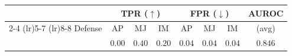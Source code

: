\begin{tabular}{l ccc ccc c}
  \toprule
  & \multicolumn{3}{c}{TPR ($\uparrow$)} & \multicolumn{3}{c}{FPR ($\downarrow$)} & AUROC \\
  \cmidrule(lr){2-4} \cmidrule(lr){5-7} \cmidrule(lr){8-8}
  Defense & AP & MJ & IM & AP & MJ & IM & (avg) \\
  \midrule
  \memsad{} & $0.00$ & $0.40$ & $0.20$ & $0.04$ & $0.04$ & $0.04$ & $0.846$ \\
  \bottomrule
\end{tabular}
